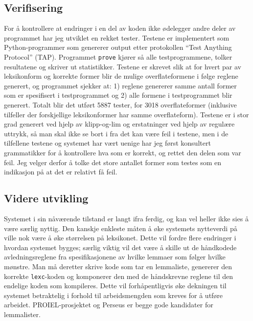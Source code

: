 \documentclass{article}
\let\prog\texttt
\begin{document}
\subsection{Verifisering}
For \aa{} kontrollere at endringer i en del av koden ikke \o{}delegger andre
deler av programmet har jeg utviklet en rekket tester. Testene er implementert
som Python-programmer som genererer output etter protokollen ``Test Anything
Protocol'' (TAP). Programmet \prog{prove} kj\o{}rer s\aa{} alle
testprogrammene, tolker resultatene og skriver ut statistikker. Testene er
skrevet slik at for hvert par av leksikonform og korrekte former blir de
mulige overflateformene i f\o{}lge reglene generert, og programmet sjekker at:
1) reglene genererer samme antall former som er spesifisert i testprogrammet
og 2) alle formene i testprogrammet blir generert. Totalt blir det utf\o{}rt
5887 tester, for 3018 overflateformer (inklusive tilfeller der forskjellige
leksikonformer har samme overflateform). Testene er i stor grad generert ved
hjelp av klipp-og-lim og erstatninger ved hjelp av regul\ae{}re uttrykk,
s\aa{} man skal ikke se bort i fra det kan v\ae{}re feil i testene, men i de
tilfellene testene og systemet har v\ae{}rt uenige har jeg f\o{}rst konsultert
grammatikker for \aa{} kontrollere hva som er korrekt, og rettet den delen som
var feil. Jeg velger derfor \aa{} tolke det store antallet former som testes
som en indikasjon p\aa{} at det er relativt f\aa{} feil.

\subsection{Videre utvikling}
Systemet i sin n\aa{}v\ae{}rende tilstand er langt ifra ferdig, og kan vel
heller ikke sies \aa{} v\ae{}re s\ae{}rlig nyttig. Den kanskje enkleste
m\aa{}ten \aa{} \o{}ke systemets nytteverdi p\aa{} ville nok v\ae{}re \aa{}
\o{}ke st\o{}rrelsen p\aa{} leksikonet. Dette vil fordre flere endringer i
hvordan systemet bygges; s\ae{}rlig viktig vil det v\ae{}re \aa{} skille ut de
h\aa{}ndkodede avledningsreglene fra spesifikasjonene av hvilke lemmaer som
f\o{}lger hvilke m\o{}nstre. Man m\aa{} deretter skrive kode som tar en
lemmaliste, genererer den korrekte \prog{lexc}-koden og komponerer den med de
h\aa{}ndskrevne reglene til den endelige koden som kompileres. Dette vil
forh\aa{}pentligvis \o{}ke dekningen til systemet betraktelig i forhold til
arbeidsmengden som kreves for \aa{} utf\o{}re arbeidet. PROIEL-prosjektet og
Perseus er begge gode kandidater for lemmalister.
\end{document}

